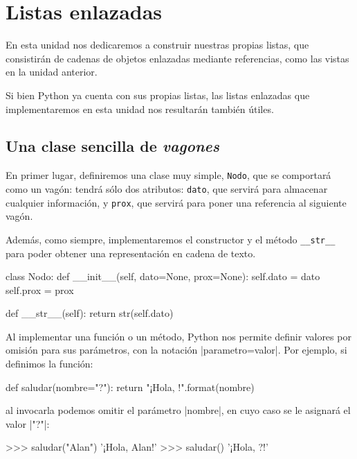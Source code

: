 \chapter{Listas enlazadas}

En esta unidad nos dedicaremos a construir nuestras propias listas, que
consistirán de cadenas de objetos enlazadas mediante referencias, como las
vistas en la unidad anterior.

Si bien Python ya cuenta con sus propias listas, las listas enlazadas que
implementaremos en esta unidad nos resultarán también útiles.

\section{Una clase sencilla de \emph{vagones}}

En primer lugar, definiremos una clase muy simple, \lstinline!Nodo!, que se
comportará como un vagón: tendrá sólo dos atributos: \lstinline!dato!, que
servirá para almacenar cualquier información, y \lstinline!prox!, que servirá
para poner una referencia al siguiente vagón.

Además, como siempre, implementaremos el constructor y el método
\lstinline!__str__! para poder obtener una representación en cadena de texto.

\begin{codigo-python-sn}
class Nodo:
    def __init__(self, dato=None, prox=None):
        self.dato = dato
        self.prox = prox

    def __str__(self):
        return str(self.dato)
\end{codigo-python-sn}

\begin{sabias_que}
Al implementar una función o un método, Python nos permite definir valores por
omisión para sus parámetros, con la notación |parametro=valor|. Por ejemplo, si
definimos la función:

\begin{codigo-python-sn}
def saludar(nombre="?"):
    return "¡Hola, {}!".format(nombre)
\end{codigo-python-sn}

\noindent al invocarla podemos omitir el parámetro |nombre|, en cuyo caso se le
asignará el valor |"?"|:

\begin{codigo-python-sn}
>>> saludar("Alan")
'¡Hola, Alan!'
>>> saludar()
'¡Hola, ?!'
\end{codigo-python-sn}
\end{sabias_que}

